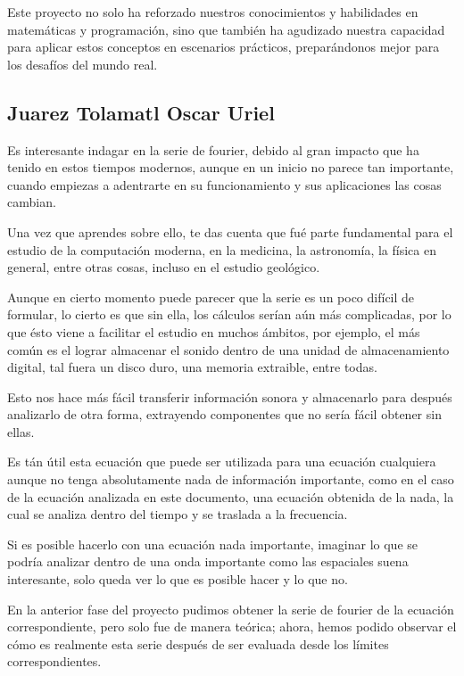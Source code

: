 Este proyecto no solo ha reforzado nuestros conocimientos y habilidades en matemáticas y programación, sino que también ha agudizado nuestra capacidad para aplicar estos conceptos en escenarios prácticos, preparándonos mejor para los desafíos del mundo real.

\subsection{Juarez Tolamatl Oscar Uriel}\label{juarez-tolamatl-oscar-uriel}

Es interesante indagar en la serie de fourier, debido al gran impacto que ha tenido en estos tiempos modernos, aunque en un inicio no parece tan importante, cuando empiezas a adentrarte en su funcionamiento y sus aplicaciones las cosas cambian.

Una vez que aprendes sobre ello, te das cuenta que fué parte fundamental para el estudio de la computación moderna, en la medicina, la astronomía, la física en general, entre otras cosas, incluso en el estudio geológico.

Aunque en cierto momento puede parecer que la serie es un poco difícil de formular, lo cierto es que sin ella, los cálculos serían aún más complicadas, por lo que ésto viene a facilitar el estudio en muchos ámbitos, por ejemplo, el más común es el lograr almacenar el sonido dentro de una unidad de almacenamiento digital, tal fuera un disco duro, una memoria extraible, entre todas.

Esto nos hace más fácil transferir información sonora y almacenarlo para después analizarlo de otra forma, extrayendo componentes que no sería fácil obtener sin ellas.

Es tán útil esta ecuación que puede ser utilizada para una ecuación cualquiera aunque no tenga absolutamente nada de información importante, como en el caso de la ecuación analizada en este documento, una ecuación obtenida de la nada, la cual se analiza dentro del tiempo y se traslada a la frecuencia.

Si es posible hacerlo con una ecuación nada importante, imaginar lo que se podría analizar dentro de una onda importante como las espaciales suena interesante, solo queda ver lo que es posible hacer y lo que no.

En la anterior fase del proyecto pudimos obtener la serie de fourier de la ecuación correspondiente, pero solo fue de manera teórica; ahora, hemos podido observar el cómo es realmente esta serie después de ser evaluada desde los límites correspondientes.

